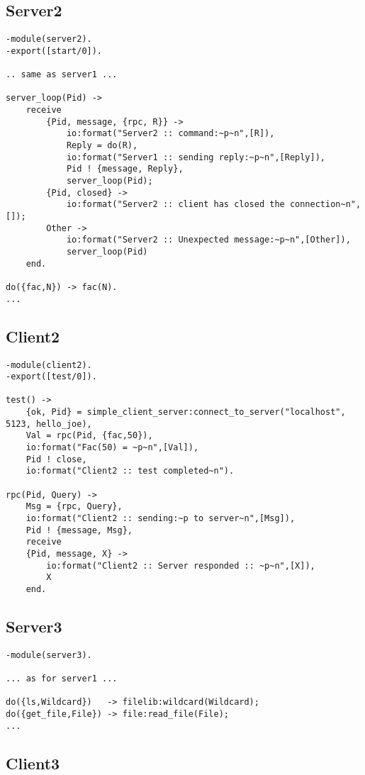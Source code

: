 \documentclass[10pt]{article}
\begin{document}
\subsection{Server2}
\begin{Verbatim}
-module(server2).
-export([start/0]).

.. same as server1 ...

server_loop(Pid) ->
    receive
        {Pid, message, {rpc, R}} ->
            io:format("Server2 :: command:~p~n",[R]),
            Reply = do(R),
            io:format("Server1 :: sending reply:~p~n",[Reply]),
            Pid ! {message, Reply},
            server_loop(Pid);
        {Pid, closed} ->            
            io:format("Server2 :: client has closed the connection~n",[]);
        Other ->
            io:format("Server2 :: Unexpected message:~p~n",[Other]),
            server_loop(Pid)
    end.

do({fac,N}) -> fac(N).
...
\end{Verbatim}


\subsection{Client2}
\begin{Verbatim}
-module(client2).
-export([test/0]).

test() ->
    {ok, Pid} = simple_client_server:connect_to_server("localhost", 5123, hello_joe), 
    Val = rpc(Pid, {fac,50}),
    io:format("Fac(50) = ~p~n",[Val]),
    Pid ! close,
    io:format("Client2 :: test completed~n").

rpc(Pid, Query) ->
    Msg = {rpc, Query},
    io:format("Client2 :: sending:~p to server~n",[Msg]),
    Pid ! {message, Msg},
    receive
	{Pid, message, X} ->
	    io:format("Client2 :: Server responded :: ~p~n",[X]),
	    X
    end.
\end{Verbatim}

\subsection{Server3}

\begin{Verbatim}
-module(server3).

... as for server1 ...

do({ls,Wildcard})   -> filelib:wildcard(Wildcard);
do({get_file,File}) -> file:read_file(File);
...
\end{Verbatim}

\subsection{Client3}
\end{document}
